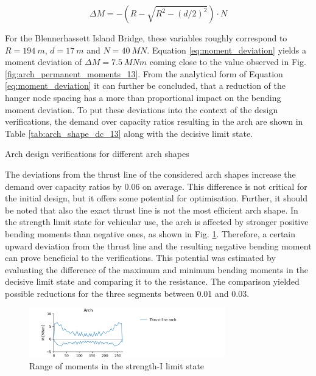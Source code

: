 \begin{equation}
    \Delta M=-\left(R-\sqrt{R^2-\left(d/2\right)^2}\right) \cdot N
    \label{eq:moment_deviation}
\end{equation}

For the Blennerhassett Island Bridge, these variables roughly correspond to $R=\SI{194}{m}$, $d=\SI{17}{m}$ and $N=\SI{40}{MN}$. Equation \eqref{eq:moment_deviation} yields a moment deviation of $\Delta M=\SI{7.5}{MNm}$ coming close to the value observed in Fig. \ref{fig:arch_permanent_moments_13}. From the analytical form of Equation \eqref{eq:moment_deviation} it can further be concluded, that a reduction of the hanger node spacing has a more than proportional impact on the bending moment deviation. To put these deviations into the context of the design verifications, the demand over capacity ratios resulting in the arch are shown in Table \ref{tab:arch_shape_dc_13} along with the decisive limit state.

\begin{table}[H]
    \centering
    \caption{Arch design verifications for different arch shapes}
    \label{tab:arch_shape_dc_13}
    
\end{table}

The deviations from the thrust line of the considered arch shapes increase the demand over capacity ratios by 0.06 on average. This difference is not critical for the initial design, but it offers some potential for optimisation. Further, it should be noted that also the exact thrust line is not the most efficient arch shape. In the strength limit state for vehicular use, the arch is affected by stronger positive bending moments than negative ones, as shown in Fig. \ref{fig:arch_shape_strength_1}. Therefore, a certain upward deviation from the thrust line and the resulting negative bending moment can prove beneficial to the verifications. This potential was estimated by evaluating the difference of the maximum and minimum bending moments in the decisive limit state and comparing it to the resistance. The comparison yielded possible reductions for the three segments between 0.01 and 0.03.

\begin{figure}[H]
    \centering
    \includegraphics[trim={1cm 0 3cm 0},clip, width=0.76\textwidth]{calculations/arch shape/strength-I_13.png}
    \caption{Range of moments in the strength-I limit state}
    \label{fig:arch_shape_strength_1}
\end{figure}

